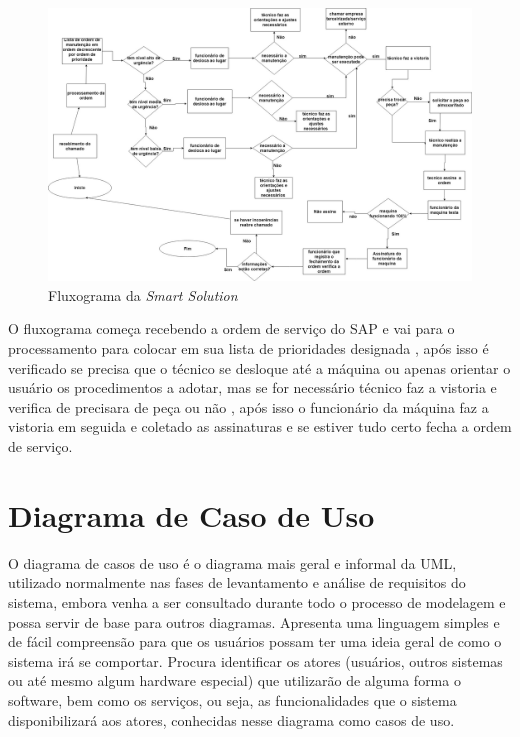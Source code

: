 \begin{figure}[H]
	\caption{\label{fluxograma2teste}Fluxograma da\textit{ Smart Solution}}%
	\begin{center}
		\includegraphics[scale=0.40,angle=90]{Figuras/fluxograma2teste}
		
	\end{center}
\end{figure}
\newpage
O fluxograma começa recebendo a ordem de serviço do SAP e vai para o processamento para colocar em sua lista de prioridades designada  , após isso é verificado se precisa que o técnico se desloque até a máquina ou apenas orientar o usuário os procedimentos a adotar, mas se for necessário técnico faz a vistoria e verifica de precisara de peça ou não , após isso o funcionário da máquina faz a vistoria  em seguida e coletado as assinaturas e se estiver tudo certo fecha a ordem de serviço.

\newpage

\section{Diagrama de Caso de Uso}

O diagrama de casos de uso é o diagrama mais geral e informal da UML, utilizado normalmente nas fases de levantamento e análise de requisitos do sistema,
embora venha a ser consultado durante todo o processo de modelagem e possa
servir de base para outros diagramas. Apresenta uma linguagem simples e de
fácil compreensão para que os usuários possam ter uma ideia geral de como o
sistema irá se comportar. Procura identificar os atores (usuários, outros sistemas ou até mesmo algum hardware especial) que utilizarão de alguma forma 
o software, bem como os serviços, ou seja, as funcionalidades que o sistema
disponibilizará aos atores, conhecidas nesse diagrama como casos de uso.\cite{guedes2009uml}


